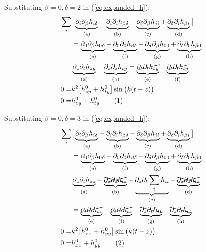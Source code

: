 \documentclass[]{article}
\newcommand\numberthis{\addtocounter{equation}{1}\tag{\theequation}}
\begin{document}
Substituting $\beta=0,\delta=2$ in (\ref{eq:expanded_h}):
\begin{align*}
	\sum_i&\big[\underbrace{\partial_i\partial_\beta h_{i\delta}}_\text{(a)} - \underbrace{\partial_i\partial_i h_{\beta\delta}}_\text{(b)} -  \underbrace{\partial_\delta\partial_\beta h_{ii}}_\text{(c)} + \underbrace{\partial_\delta\partial_i h_{\beta i}}_\text{(d)}\big]\\
	&=\underbrace{\partial_0\partial_\beta h_{0\delta}}_\text{(e)} - \underbrace{\partial_0\partial_0 h_{\beta\delta}}_\text{(f)} -  \underbrace{\partial_\delta\partial_\beta h_{00}}_\text{(g)} + \underbrace{\partial_\delta\partial_0 h_{\beta 0}}_\text{(h)}\\
	&\underbrace{\partial_z\partial_t h_{zy}}_\text{(a)} - \underbrace{\partial_z\partial_z h_{ty}}_\text{(b)} =\underbrace{\cancel{\partial_t\partial_t h_{ty}}}_\text{(e)} - \underbrace{\cancel{\partial_t\partial_t h_{ty}}}_\text{(f)}\\
	0=&k^2 \big[h^0_{zy}+h^0_{ty}\big] \sin\big(k(t-z)\big)\\
	0=& h^0_{zy}+h^0_{ty} \numberthis \label{eq:con:02}
\end{align*}

Substituting $\beta=0,\delta=3$ in (\ref{eq:expanded_h}):
\begin{align*}
	\sum_i&\big[\underbrace{\partial_i\partial_\beta h_{i\delta}}_\text{(a)} - \underbrace{\partial_i\partial_i h_{\beta\delta}}_\text{(b)} -  \underbrace{\partial_\delta\partial_\beta h_{ii}}_\text{(c)} + \underbrace{\partial_\delta\partial_i h_{\beta i}}_\text{(d)}\big]\\
	&=\underbrace{\partial_0\partial_\beta h_{0\delta}}_\text{(e)} - \underbrace{\partial_0\partial_0 h_{\beta\delta}}_\text{(f)} -  \underbrace{\partial_\delta\partial_\beta h_{00}}_\text{(g)} + \underbrace{\partial_\delta\partial_0 h_{\beta 0}}_\text{(h)}\\
	&\underbrace{\partial_z\partial_t h_{zz}}_\text{(a)} - \underbrace{\xcancel{\partial_z\partial_z h_{tz}}}_\text{(b)} -  \underbrace{\partial_z\partial_t \sum_i h_{ii}}_\text{(c)} + \underbrace{\xcancel{\partial_z\partial_z h_{tz}}}_\text{(d)}\\
	&=\underbrace{\cancel{\partial_t\partial_t h_{tz}}}_\text{(e)} - \underbrace{\cancel{\partial_t\partial_t h_{tz}}}_\text{(f)} -  \underbrace{\bcancel{\partial_z\partial_t h_{tt}}}_\text{(g)} + \underbrace{\bcancel{\partial_z\partial_t h_{tt}}}_\text{(h)}\\
	0=&k^2 \big[h^0_{xx}+h^0_{yy}\big] \sin\big(k(t-z)\big)\\
	0=&h^0_{xx}+h^0_{yy} \numberthis \label{eq:con:03}
\end{align*}
\end{document}
